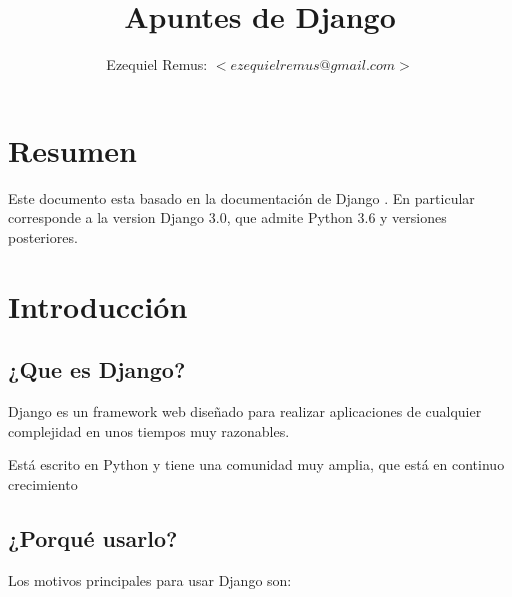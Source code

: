 \documentclass[10pt]{article}
\title{\bfseries \huge {Apuntes de Django} }
\author{Ezequiel Remus: $<ezequielremus@gmail.com>$}
\date{}
\newcommand{\py}[1]{{\textcolor{B}{Python} #1}}
\newcommand{\django}[1]{{\textcolor{G}{Django} #1}}
\begin{document}
\renewcommand{\tablename}{Tabla}
\maketitle
\newpage
\section*{Resumen}

Este documento esta basado en la documentación de \django{}.
En particular corresponde a la version Django 3.0, que admite Python 3.6 y versiones posteriores.  
\tableofcontents
\newpage
\section{Introducción}
\subsection{¿Que es Django?}

\django{} es un framework web diseñado para realizar aplicaciones de cualquier complejidad en unos tiempos muy razonables.

Está escrito en \py{} y tiene una comunidad muy amplia, que está en continuo crecimiento

\subsection{¿Porqué usarlo?}

Los motivos principales para usar \django{} son:
 
\end{document}
